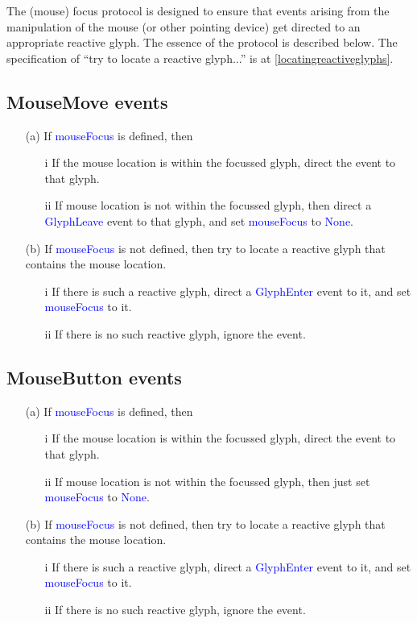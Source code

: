 \documentclass[12pt,a4paper]{article}
\def\Scala#1{\textcolor{blue}{\textsf{#1}}}
\def\SS#1{\subsection{#1}}
\begin{document}
The (mouse) focus protocol is designed to ensure that events arising from
the manipulation of the mouse (or other pointing device) get directed
to an appropriate reactive glyph. The essence of the protocol is
described below. The specification of ``try to locate a
reactive glyph...'' is at \ref{locatingreactiveglyphs}.

\SS{MouseMove events}
  \begin{itemize}
    \item[(a)] If \Scala{mouseFocus} is defined, then
    \begin{itemize}
        \item[i] If the mouse location is within the focussed glyph, direct the
        event to that glyph.
        \item[ii] If mouse location is not within the focussed glyph, then direct a
        \Scala{GlyphLeave} event to that glyph, and set \Scala{mouseFocus} to \Scala{None}.
    \end{itemize}
    \item[(b)] If \Scala{mouseFocus} is not defined, then try to locate a reactive glyph
               that contains the mouse location.
              \begin{itemize}
                  \item[i] If there is such a reactive glyph, direct a \Scala{GlyphEnter}
                        event to it, and set \Scala{mouseFocus} to it.
                  \item[ii] If there is no such reactive glyph, ignore the event.
              \end{itemize}
  \end{itemize}

  
\SS{MouseButton events}
\begin{itemize}
    \item[(a)] If \Scala{mouseFocus} is defined, then
    \begin{itemize}
        \item[i] If the mouse location is within the focussed glyph, direct the
        event to that glyph.
        \item[ii] If mouse location is not within the focussed glyph, then
        just set \Scala{mouseFocus} to \Scala{None}.
    \end{itemize}
    \item[(b)] If \Scala{mouseFocus} is not defined, then try to locate a reactive glyph
               that contains the mouse location.
              \begin{itemize}
                  \item[i] If there is such a reactive glyph, direct a \Scala{GlyphEnter}
                        event to it, and set \Scala{mouseFocus} to it.
                  \item[ii] If there is no such reactive glyph, ignore the event.
              \end{itemize}
  \end{itemize}
\end{document}
